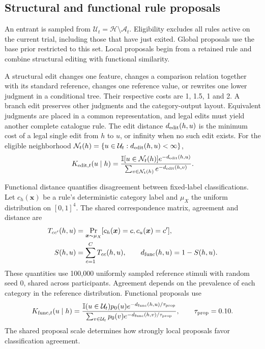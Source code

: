 \subsection*{Structural and functional rule proposals}
\label{m:proposals}

An entrant is sampled from $\mathcal U_t=\mathcal H\setminus\mathcal A_t$. Eligibility excludes all rules active on the current trial, including those that have just exited. Global proposals use the base prior restricted to this set. Local proposals begin from a retained rule and combine structural editing with functional similarity.

A structural edit changes one feature, changes a comparison relation together with its standard reference, changes one reference value, or rewrites one lower judgment in a conditional tree. Their respective costs are 1, 1.5, 1 and 2. A branch edit preserves other judgments and the category-output layout. Equivalent judgments are placed in a common representation, and legal edits must yield another complete catalogue rule. The edit distance $d_{\rm edit}(h,u)$ is the minimum cost of a legal single edit from $h$ to $u$, or infinity when no such edit exists. For the eligible neighborhood $\mathcal N_t(h)=\{u\in\mathcal U_t:d_{\rm edit}(h,u)<\infty\}$,
\begin{equation}
K_{{\rm edit},t}(u\mid h)=
\frac{\mathbb I[u\in\mathcal N_t(h)]e^{-d_{\rm edit}(h,u)}}
{\sum_{v\in\mathcal N_t(h)}e^{-d_{\rm edit}(h,v)}}.
\label{eq:structural-proposal}
\end{equation}

Functional distance quantifies disagreement between fixed-label classifications. Let $c_h(\bm x)$ be a rule's deterministic category label and $\mu_X$ the uniform distribution on $[0,1]^4$. The shared correspondence matrix, agreement and distance are
\begin{align}
T_{cc'}(h,u)&=\Pr_{\bm x\sim\mu_X}[c_h(\bm x)=c,c_u(\bm x)=c'],\\
S(h,u)&=\sum_{c=1}^{C}T_{cc}(h,u),
\qquad d_{\rm func}(h,u)=1-S(h,u).
\label{eq:functional-distance-paper}
\end{align}
These quantities use 100,000 uniformly sampled reference stimuli with random seed 0, shared across participants. Agreement depends on the prevalence of each category in the reference distribution. Functional proposals use
\begin{equation}
K_{{\rm func},t}(u\mid h)=
\frac{\mathbb I(u\in\mathcal U_t)p_0(u)e^{-d_{\rm func}(h,u)/\tau_{\rm prop}}}
{\sum_{v\in\mathcal U_t}p_0(v)e^{-d_{\rm func}(h,v)/\tau_{\rm prop}}},
\qquad\tau_{\rm prop}=0.10.
\label{eq:functional-proposal-paper}
\end{equation}
The shared proposal scale determines how strongly local proposals favor classification agreement.


